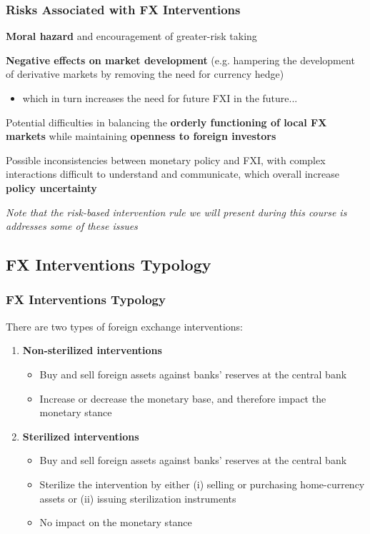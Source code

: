 \documentclass{beamer}
\newenvironment{wideitemize}{\itemize\addtolength{\itemsep}{10pt}}{\enditemize}
\begin{document}
\begin{frame}
  \frametitle{Risks Associated with FX Interventions}
  \begin{wideitemize}
    \item \textbf{Moral hazard} and encouragement of greater-risk taking
    \item \textbf{Negative effects on market development} (e.g. hampering the development of derivative markets by removing the need for currency hedge)
      \begin{itemize}
      \item which in turn increases the need for future FXI in the future...
      \end{itemize}
    \item Potential difficulties in balancing the \textbf{orderly functioning of local FX markets} while maintaining \textbf{openness to foreign investors}
    \item Possible inconsistencies between monetary policy and FXI, with complex interactions difficult to understand and communicate, which overall increase \textbf{policy uncertainty}
    \item \emph{Note that the risk-based intervention rule we will present during this course is addresses some of these issues}
  \end{wideitemize}
\end{frame}


\subsection{FX Interventions Typology}
\begin{frame}
  \frametitle{FX Interventions Typology}
  
  There are two types of foreign exchange interventions:\\
  \medskip

  \begin{enumerate}
  \item \textbf{Non-sterilized interventions}
    \begin{itemize}
    \item Buy and sell foreign assets against banks' reserves at the central bank
    \item Increase or decrease the monetary base, and therefore impact the monetary stance
    \end{itemize}
  \item \textbf{Sterilized interventions}
    \begin{itemize}
    \item Buy and sell foreign assets against banks' reserves at the central bank
    \item Sterilize the intervention by either (i) selling or purchasing home-currency assets or (ii) issuing sterilization instruments 
    \item No impact on the monetary stance
    \end{itemize}
  \end{enumerate}
\end{frame}
\end{document}
